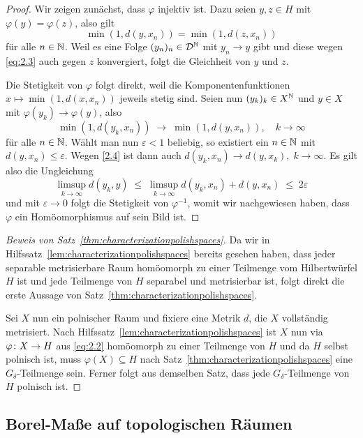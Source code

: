 \documentclass[../main/main.tex]{subfiles}
\begin{document}
	\begin{proof}
		Wir zeigen zunächst, dass $\varphi$ injektiv ist. 
		Dazu seien $y, z \in H$ mit $\varphi(y) = \varphi(z)$, also gilt
		\[\min(1, d(y, x_n)) = \min(1, d(z, x_n)) \label{eq:2.3} \tag{2.3}\]
		für alle $n \in \mathbb{N}$. Weil es eine Folge $(y_n)_n \in \mathcal{D}^{\mathbb{N}}$ mit 
		$y_n \to y$ gibt und diese wegen \eqref{eq:2.3} auch gegen $z$ 
		konvergiert, folgt die Gleichheit von $y$ und $z$.
		
		Die Stetigkeit von $\varphi$ folgt direkt, weil die 
		Komponentenfunktionen $x \mapsto \min(1, d(x, x_n))$ jeweils stetig sind. 
		Seien nun $(y_k)_k \in X^{\mathbb{N}}$ und $y \in X$ mit $\varphi(y_k) \to \varphi(y)$, 
		also
		\[\min(1, d(y_k, x_n)) \; \to \; \min(1, d(y, x_n)), 
		\quad k \to \infty \label{2.4} \tag{2.4}\]
		für alle $n \in \mathbb{N}$. Wählt man nun $\varepsilon < 1$ beliebig, 
		so existiert ein $n \in \mathbb{N}$ mit $d(y, x_n) \leq \varepsilon$. 
		Wegen \eqref{2.4} ist dann auch
		$d(y_k, x_n) \to d(y, x_k), \; k \to \infty$. Es gilt also die Ungleichung
		$$\limsup_{k \to \infty} d(y_k, y) \; \leq \; 
		\limsup_{k \to \infty} d(y_k, x_n) + d(y, x_n) \; \leq \; 2\varepsilon$$
		und mit $\varepsilon \to 0$ folgt die Stetigkeit von $\varphi^{-1}$, 
		womit wir nachgewiesen haben, dass $\varphi$ ein Homöomorphismus auf sein Bild ist. 
	\end{proof}

	\begin{proof}[Beweis von Satz~\ref{thm:characterizationpolishspaces}]
		Da wir in Hilfssatz~\ref{lem:characterizationpolishspaces} bereits 
		gesehen haben, dass jeder separable metrisierbare Raum homöomorph zu einer 
		Teilmenge vom Hilbertwürfel $H$ ist und jede Teilmenge von $H$ separabel und metrisierbar ist,
		folgt direkt die erste Aussage von Satz~\ref{thm:characterizationpolishspaces}. 
		
		Sei $X$ nun ein polnischer Raum und fixiere eine Metrik $d$, die $X$ vollständig metrisiert. 
		Nach Hilfssatz~\ref{lem:characterizationpolishspaces} ist $X$ nun via $\varphi \colon X \to H$ aus \eqref{eq:2.2}
		homöomorph zu einer Teilmenge von $H$ und da $H$ selbst polnisch ist, muss $\varphi(X) \subseteq H$ nach 
		Satz~\ref{thm:characterizationpolishspaces} eine $G_\delta$-Teilmenge sein.
		Ferner folgt aus demselben Satz, dass jede $G_\delta$-Teilmenge von $H$ polnisch ist.
	\end{proof}
	
	\subsection{Borel-Maße auf topologischen Räumen}
	
\end{document}
